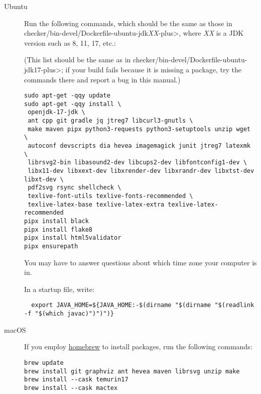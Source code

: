 \begin{description}
\item[Ubuntu]
  Run the following commands, which should be the same as those in
  \<checker/bin-devel/Dockerfile-ubuntu-jdk\emph{XX}-plus>, where \emph{XX}
  is a JDK version such as 8, 11, 17, etc.:

(This list should be the same as in
\<checker/bin-devel/Dockerfile-ubuntu-jdk17-plus>; if your build fails
because it is missing a package, try the commands there and report a bug
in this manual.)


\begin{Verbatim}
sudo apt-get -qqy update
sudo apt-get -qqy install \
 openjdk-17-jdk \
 ant cpp git gradle jq jtreg7 libcurl3-gnutls \
 make maven pipx python3-requests python3-setuptools unzip wget \
 autoconf devscripts dia hevea imagemagick junit jtreg7 latexmk \
 librsvg2-bin libasound2-dev libcups2-dev libfontconfig1-dev \
 libx11-dev libxext-dev libxrender-dev libxrandr-dev libxtst-dev libxt-dev \
 pdf2svg rsync shellcheck \
 texlive-font-utils texlive-fonts-recommended \
 texlive-latex-base texlive-latex-extra texlive-latex-recommended
pipx install black
pipx install flake8
pipx install html5validator
pipx ensurepath
\end{Verbatim}

  You may have to answer questions about which time zone your computer is in.

In a startup file, write:
\begin{smaller}
\begin{Verbatim}
  export JAVA_HOME=${JAVA_HOME:-$(dirname "$(dirname "$(readlink -f "$(which javac)")")")}
\end{Verbatim}
\end{smaller}

\item[macOS]
  If you employ \href{https://brew.sh}{homebrew} to install packages, run
  the following commands:

\begin{Verbatim}
brew update
brew install git graphviz ant hevea maven librsvg unzip make
brew install --cask temurin17
brew install --cask mactex
\end{Verbatim}


\end{description}
